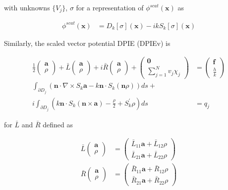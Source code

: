 \documentclass{article}[12pt]
\newcommand{\bvec}[1]{\boldsymbol{#1}}
\begin{document}
	with unknowns $\lbrace V_j\rbrace$, $\sigma$ for a representation of $\phi^{scat}(\bvec{x})$ as
	
	\begin{align*}
	\phi^{scat}(\bvec{x}) &= D_k [\sigma](\bvec{x}) - i k S_k [\sigma] (\bvec{x})
	\end{align*}
	
	Similarly, the scaled vector potential DPIE (DPIEv) is
	
	\begin{align*}
	\frac{1}{2}\begin{pmatrix}
	\bvec{a} \\
	\rho
	\end{pmatrix}
	+ 
	\bar{L} \begin{pmatrix}
	\bvec{a} \\
	\rho
	\end{pmatrix}
	+
	i \bar{R} \begin{pmatrix}
	\bvec{a} \\
	\rho
	\end{pmatrix}
	+ \begin{pmatrix}
	\bvec{0} \\
	\sum_{j=1}^N v_j \chi_j
	\end{pmatrix}
	&= \begin{pmatrix}
	\bvec{f} \\
	\frac{h}{k}
	\end{pmatrix} \\
	\int_{\partial D_j} \left(  \bvec{n} \cdot \nabla \times S_k\bvec{a} - k \bvec{n} \cdot S_k\left(\bvec{n} \rho \right) \right) ds + \;\;\;\;\;\;\;\;\;&\\
	i \int_{\partial D_j} \left(k \bvec{n} \cdot S_k\left(\bvec{n} \times \bvec{a}\right) - \frac{\rho}{2} + S_k^{'}\rho \right) ds &= q_j
	\end{align*}
	
	for $\bar{L}$ and $\bar{R}$ defined as 
	
	\begin{align*}
	\bar{L}\begin{pmatrix}
	\bvec{a} \\
	\rho
	\end{pmatrix}&= \begin{pmatrix}
	\bar{L}_{11} \bvec{a} + \bar{L}_{12} \rho \\
	\bar{L}_{21} \bvec{a} + \bar{L}_{22} \rho
	\end{pmatrix} \\
	\bar{R} \begin{pmatrix}
	\bvec{a} \\
	\rho
	\end{pmatrix}  &= \begin{pmatrix}
	\bar{R}_{11} \bvec{a} + \bar{R}_{12} \rho \\
	\bar{R}_{21} \bvec{a} + \bar{R}_{22} \rho
	\end{pmatrix}
	\end{align*}
	
\end{document}
